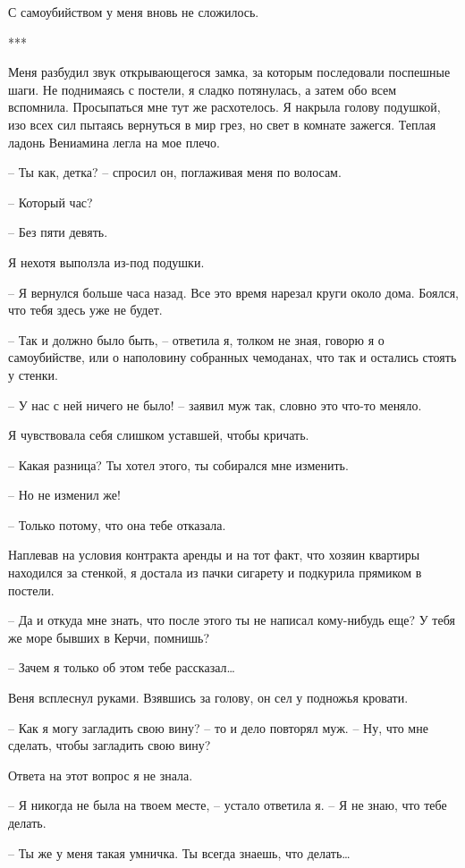 \documentclass[
]{book}
\begin{document}
С самоубийством у меня вновь не сложилось.

***

Меня разбудил звук открывающегося замка, за которым последовали поспешные шаги. Не поднимаясь с постели, я сладко потянулась, а затем обо всем вспомнила. Просыпаться мне тут же расхотелось. Я накрыла голову подушкой, изо всех сил пытаясь вернуться в мир грез, но свет в комнате зажегся. Теплая ладонь Вениамина легла на мое плечо.

-- Ты как, детка? -- спросил он, поглаживая меня по волосам.

-- Который час?

-- Без пяти девять.

Я нехотя выползла из-под подушки.

-- Я вернулся больше часа назад. Все это время нарезал круги около дома. Боялся, что тебя здесь уже не будет.

-- Так и должно было быть, -- ответила я, толком не зная, говорю я о самоубийстве, или о наполовину собранных чемоданах, что так и остались стоять у стенки.

-- У нас с ней ничего не было! -- заявил муж так, словно это что-то меняло.

Я чувствовала себя слишком уставшей, чтобы кричать.

-- Какая разница? Ты хотел этого, ты собирался мне изменить.

-- Но не изменил же!

-- Только потому, что она тебе отказала.

Наплевав на условия контракта аренды и на тот факт, что хозяин квартиры находился за стенкой, я достала из пачки сигарету и подкурила прямиком в постели.

-- Да и откуда мне знать, что после этого ты не написал кому-нибудь еще? У тебя же море бывших в Керчи, помнишь?

-- Зачем я только об этом тебе рассказал\ldots{}

Веня всплеснул руками. Взявшись за голову, он сел у подножья кровати.

-- Как я могу загладить свою вину? -- то и дело повторял муж. -- Ну, что мне сделать, чтобы загладить свою вину?

Ответа на этот вопрос я не знала.

-- Я никогда не была на твоем месте, -- устало ответила я. -- Я не знаю, что тебе делать.

-- Ты же у меня такая умничка. Ты всегда знаешь, что делать\ldots{}
\end{document}
